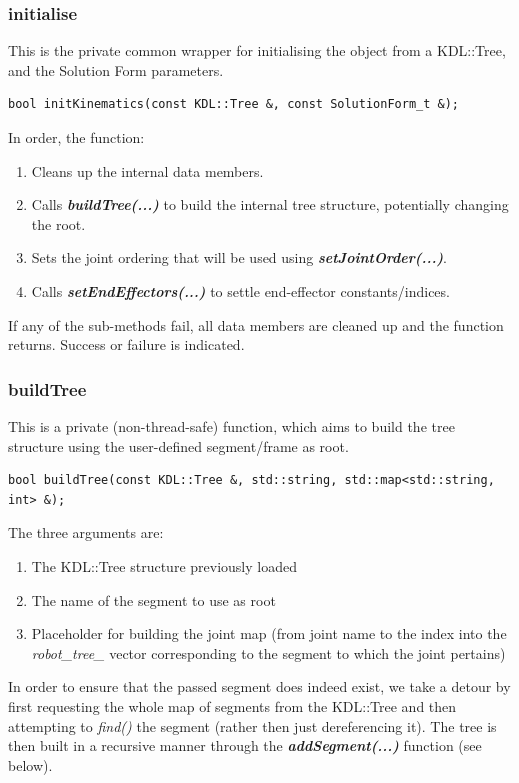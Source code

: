 \documentclass[12pt,a4paper,onecolumn]{article}
\begin{document}
\subsubsection*{initialise}
This is the private common wrapper for initialising the object from a KDL::Tree, and the Solution Form parameters. 
\begin{lstlisting}
bool initKinematics(const KDL::Tree &, const SolutionForm_t &);
\end{lstlisting}
In order, the function:
\begin{enumerate}
\item Cleans up the internal data members.
\item Calls \textbf{\textit{buildTree(...)}} to build the internal tree structure, potentially changing the root.
\item Sets the joint ordering that will be used using \textit{\textbf{setJointOrder(...)}}.
\item Calls \textbf{\textit{setEndEffectors(...)}} to settle end-effector constants/indices.
\end{enumerate}
If any of the sub-methods fail, all data members are cleaned up and the function returns. Success or failure is indicated.

\subsubsection*{buildTree}
This is a private (non-thread-safe) function, which aims to build the tree structure using the user-defined segment/frame as root.
\begin{lstlisting}
bool buildTree(const KDL::Tree &, std::string, std::map<std::string, int> &);
\end{lstlisting}
The three arguments are:
\begin{enumerate}
\item The KDL::Tree structure previously loaded
\item The name of the segment to use as root
\item Placeholder for building the joint map (from joint name to the index into the \textit{robot\_tree\_} vector corresponding to the segment to which the joint pertains)
\end{enumerate}
In order to ensure that the passed segment does indeed exist, we take a detour by first requesting the whole map of segments from the KDL::Tree and then attempting to \textit{find()} the segment (rather then just dereferencing it). The tree is then built in a recursive manner through the \textbf{\textit{addSegment(...)}} function (see below).
\end{document}
